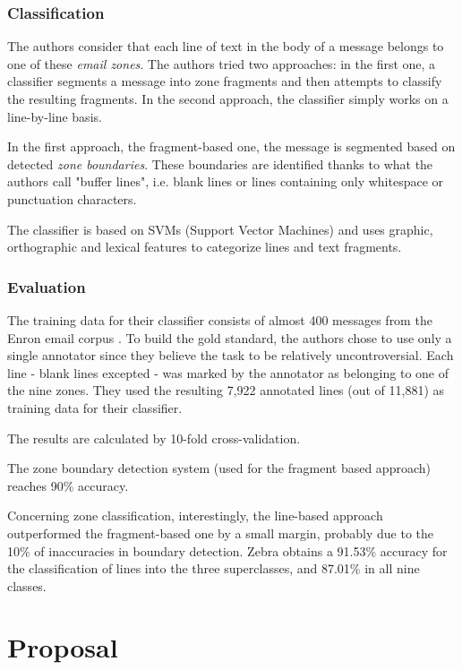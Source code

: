 \documentclass[11pt]{article}
\begin{document}
\subsubsection{Classification}

The authors consider that each line of text in the body of a message belongs to one of these \textit{email zones}. The authors tried two approaches: in the first one, a classifier segments a message into zone fragments and then attempts to classify the resulting fragments. In the second approach, the classifier simply works on a line-by-line basis.

In the first approach, the fragment-based one, the message is segmented based on detected \textit{zone boundaries}. These boundaries are identified thanks to what the authors call "buffer lines", i.e. blank lines or lines containing only whitespace or punctuation characters.

The classifier is based on SVMs (Support Vector Machines) and uses graphic, orthographic and lexical features to categorize lines and text fragments.

\subsubsection{Evaluation}

The training data for their classifier consists of almost 400 messages from the Enron email corpus \cite{klimt2004enron}. To build the gold standard, the authors chose to use only a single annotator since they believe the task to be relatively uncontroversial. Each line - blank lines excepted - was marked by the annotator as belonging to one of the nine zones. They used the resulting 7,922 annotated lines (out of 11,881) as training data for their classifier.

The results are calculated by 10-fold cross-validation. 

The zone boundary detection system (used for the fragment based approach) reaches 90\% accuracy.

Concerning zone classification, interestingly, the line-based approach outperformed the fragment-based one by a small margin, probably due to the 10\% of inaccuracies in boundary detection. Zebra obtains a 91.53\% accuracy for the classification of lines into the three superclasses, and 87.01\% in all nine classes.

\section{Proposal}
\end{document}
